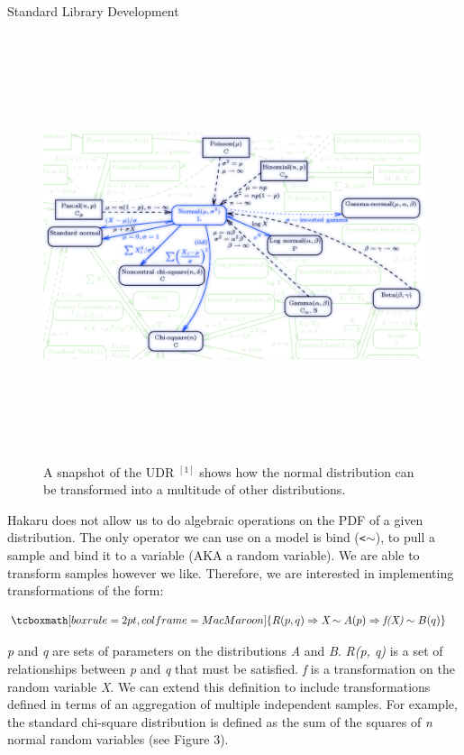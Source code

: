 \documentclass[22pt]{beamer}
\begin{document}
\begin{frame}[fragile]
\begin{textblock}{5}
\begin{textblock}{5}
\begin{block}{\Large{Standard Library Development}}
\begin{figure}
\centering
\includegraphics[height=12.5cm]{UDR.png}
\caption{\tiny{A snapshot of the UDR $^{[1]}$ shows how the normal distribution can be transformed into a multitude of other distributions.}}
\end{figure}

\scriptsize{Hakaru does not allow us to do algebraic operations on the PDF of a given distribution. The only operator we can use on a model is bind ({\tt \tiny{<$\sim$}}), to pull a sample and bind it to a variable (AKA a random variable). We are able to transform samples however we like. Therefore, we are interested in implementing transformations of the form:}

\begin{equation*}
\begin{aligned}
& \tcboxmath[boxrule=2pt,colframe=MacMaroon]{R(p, q) \Rightarrow \textit{X} \sim A(p) \Rightarrow \textit{f(X)} \sim B(q)}
\end{aligned}
\end{equation*}

\bigskip

\scriptsize{\textit{p} and \textit{q} are sets of parameters on the distributions \textit{A}} and \textit{B}. \textit{R(p, q)} is a set of relationships between \textit{p} and \textit{q} that must be satisfied. \textit{f} is a transformation on the random variable \textit{X}. We can extend this definition to include transformations defined in terms of an aggregation of multiple independent samples. For example, the standard chi-square distribution is defined as the sum of the squares of \textit{n} normal random variables (see Figure 3). 


\end{block}
\end{textblock}
\end{textblock}
\end{frame}
\end{document}
